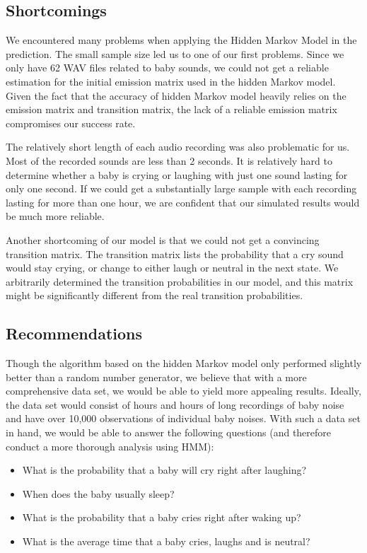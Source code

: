 \documentclass[paper=a4, fontsize=11pt]{scrartcl}
\numberwithin{equation}{section}
\numberwithin{figure}{section}
\numberwithin{table}{section}
\begin{document}

\subsection{Shortcomings}\label{subsec:hmmshort}
We encountered many problems when applying the Hidden Markov Model in the prediction. The small sample size led us to one of our first problems. Since we only have 62 WAV files related to baby sounds, we could not get a reliable estimation for the initial emission matrix used in the hidden Markov model. Given the fact that the accuracy of hidden Markov model heavily relies on the emission matrix and transition matrix, the lack of a reliable emission matrix compromises our success rate.

The relatively short length of each audio recording was also problematic for us. Most of the recorded sounds are less than 2 seconds. It is relatively hard to determine whether a baby is crying or laughing with just one sound lasting for only one second. If we could get a substantially large sample with each recording lasting for more than one hour, we are confident that our simulated results would be much more reliable.

Another shortcoming of our model is that we could not get a convincing transition matrix. The transition matrix lists the probability that a cry sound would stay crying, or change to either laugh or neutral in the next state. We arbitrarily determined the transition probabilities in our model, and this matrix might be significantly different from the real transition probabilities.

\subsection{Recommendations}
Though the algorithm based on the hidden Markov model only performed slightly better than a random number generator, we believe that with a more comprehensive data set, we would be able to yield more appealing results. Ideally, the data set would consist of hours and hours of long recordings of baby noise and have over 10,000 observations of individual baby noises. With such a data set in hand, we would be able to answer the following questions (and therefore conduct a more thorough analysis using HMM):

\begin{itemize}
	\item What is the probability that a baby will cry right after laughing?
    \item When does the baby usually sleep?
    \item What is the probability that a baby cries right after waking up?
    \item What is the average time that a baby cries, laughs and is neutral? 
\end{itemize}
\end{document}
